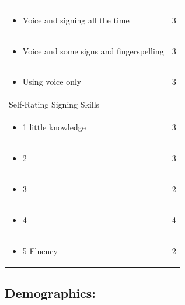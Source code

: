 \documentclass[11.5pt]{sig-alternate} %
\begin{document}
\begin{large}
\begin{table}[htbp]
\begin{tabular}{|l|c|}
\begin{itemize}[noitemsep, topsep=0pt] \item Voice and signing all the time \end{itemize} & 3 \\
\begin{itemize}[noitemsep, topsep=0pt] \item Voice and some signs and fingerspelling \end{itemize} & 3 \\
\begin{itemize}[noitemsep, topsep=0pt] \item Using voice only \end{itemize} & 3 \\ \hline
Self-Rating Signing Skills & \\
\begin{itemize}[noitemsep, topsep=0pt] \item 1 little knowledge \end{itemize} & 3 \\
\begin{itemize}[noitemsep, topsep=0pt] \item 2 \end{itemize} & 3 \\
\begin{itemize}[noitemsep, topsep=0pt] \item 3 \end{itemize} & 2 \\
\begin{itemize}[noitemsep, topsep=0pt] \item 4 \end{itemize} & 4 \\
\begin{itemize}[noitemsep, topsep=0pt] \item 5 Fluency \end{itemize} & 2 \\ \hline
\end{tabular}
\end{table}

\subsection*{Demographics:}


\end{large}
\end{document}
